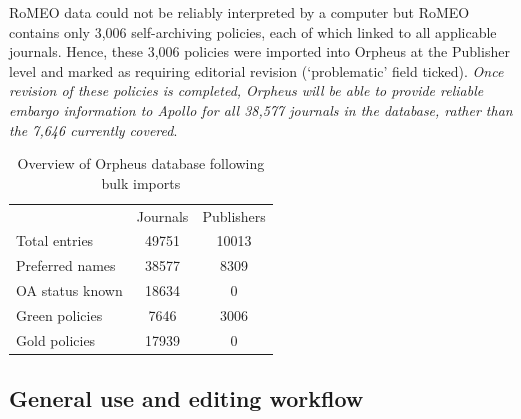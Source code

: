 \documentclass[british, 12pt]{article}
\begin{document}
RoMEO data could not be reliably interpreted by a computer but RoMEO contains only 3,006 self-archiving policies, each of which linked to all applicable journals. Hence, these 3,006 policies were imported into Orpheus at the Publisher level and marked as requiring editorial revision (`problematic' field ticked). \emph{Once revision of these policies is completed, Orpheus will be able to provide reliable embargo information to Apollo for all 38,577 journals in the database, rather than the 7,646 currently covered}.

\begin{table}
\begin{center}
\caption{Overview of Orpheus database following bulk imports}
\label{table-bulk-import}
\begin{tabular}{lcc}
			&Journals 	&Publishers\\
Total entries		&49751		&10013\\
Preferred names		&38577		&8309\\
OA status known		&18634		&0\\
Green policies		&7646		&3006\\
Gold policies		&17939		&0\\
\end{tabular} 
\end{center}
\end{table} 

\subsection{General use and editing workflow}
\end{document}
